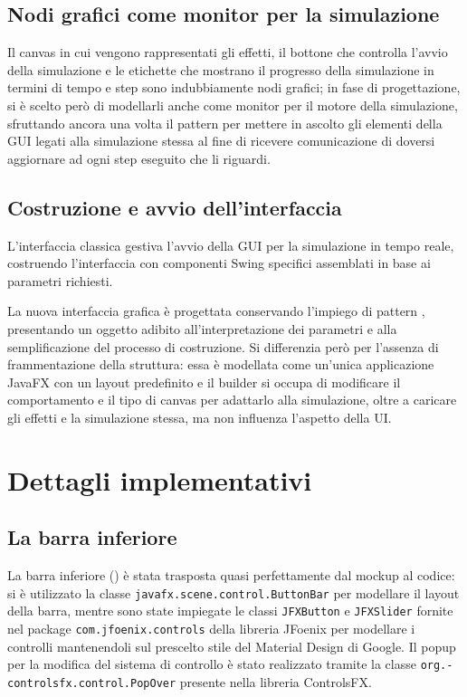         \subsection{Nodi grafici come monitor per la simulazione}
            Il canvas in cui vengono rappresentati gli effetti, il bottone che controlla l'avvio della simulazione e le etichette che mostrano il progresso della simulazione in termini di tempo e step sono indubbiamente nodi grafici;
            in fase di progettazione, si è scelto però di modellarli anche come monitor per il motore della simulazione, sfruttando ancora una volta il pattern  per mettere in ascolto gli elementi della GUI legati alla simulazione stessa al fine di ricevere comunicazione di doversi aggiornare ad ogni step eseguito che li riguardi.

        \subsection{Costruzione e avvio dell'interfaccia}\label{subsec:avvio}
            L'interfaccia classica gestiva l'avvio della GUI per la simulazione in tempo reale, costruendo l'interfaccia con componenti Swing specifici assemblati in base ai parametri richiesti.

            La nuova interfaccia grafica è progettata conservando l'impiego di pattern , presentando un oggetto adibito all'interpretazione dei parametri e alla semplificazione del processo di costruzione.
            Si differenzia però per l'assenza di frammentazione della struttura:
            essa è modellata come un'unica applicazione JavaFX con un layout predefinito e il builder si occupa di modificare il comportamento e il tipo di canvas per adattarlo alla simulazione, oltre a caricare gli effetti e la simulazione stessa, ma non influenza l'aspetto della UI.

    \section{Dettagli implementativi}\label{sec:dettagli}

        \subsection{La barra inferiore}\label{subsec:barra}
            La barra inferiore () è stata trasposta quasi perfettamente dal mockup al codice:
            si è utilizzato la classe \texttt{javafx\dothyp scene\dothyp control\dothyp ButtonBar} per modellare il layout della barra, mentre sono state impiegate le classi \texttt{JFXButton} e \texttt{JFXSlider} fornite nel package \texttt{com\dothyp jfoenix\dothyp controls} della libreria JFoenix per modellare i controlli mantenendoli sul prescelto stile del Material Design di Google.
            Il popup per la modifica del sistema di controllo è stato realizzato tramite la classe \texttt{org\dothyp controlsfx\dothyp control\dothyp PopOver} presente nella libreria ControlsFX.

